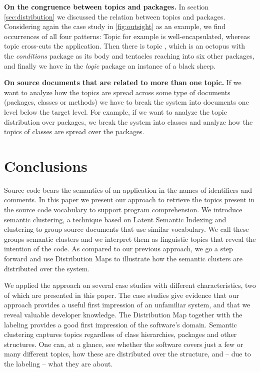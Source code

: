\documentclass[10pt]{book}
\begin{document}
\textbf{On the congruence between topics and packages.} In section \autoref{sec:distribution} we discussed the relation between topics and packages. Considering again the case study in \autoref{fig:outsight} as an example, we find occurrences of all four patterns: Topic \darkgreen for example is well-encapsulated, whereas topic \yellow cross-cuts the application. Then there is topic \blue, which is an octopus with the \emph{conditions} package as its body and tentacles reaching into six other packages, and finally we have in the \emph{logic} package an instance of a black sheep.

\textbf{On source documents that are related to more than one topic.} If we want to analyze how the topics are spread across some type of documents (\eg packages, classes or methods) we have to break the system into documents one level below the target level. For example, if we want to analyze the topic distribution over packages, we break the system into classes and analyze how the topics of classes are spread over the packages.

\section{Conclusions}\label{sec:conclusions}

Source code bears the semantics of an application in the names of identifiers and comments. In this paper we present our approach to retrieve the topics present in the source code vocabulary to support program comprehension. We introduce semantic clustering, a technique based on Latent Semantic Indexing and clustering to group source documents that use similar vocabulary. We call these groups semantic clusters and we interpret them as linguistic topics that reveal the intention of the code. As compared to our previous approach, we go a step forward and use Distribution Maps to illustrate how the semantic clusters are distributed over the system.

We applied the approach on several case studies with different characteristics, two of which are presented in this paper.  The case studies give evidence that our approach provides a useful first impression of an unfamiliar system, and that we reveal valuable developer knowledge. The Distribution Map together with the labeling provides a good first impression of the software's domain. Semantic clustering captures topics regardless of class hierarchies, packages and other structures. One can, at a glance, see whether the software covers just a few or many different topics, how these are distributed over the structure, and -- due to the labeling -- what they are about.
\end{document}
